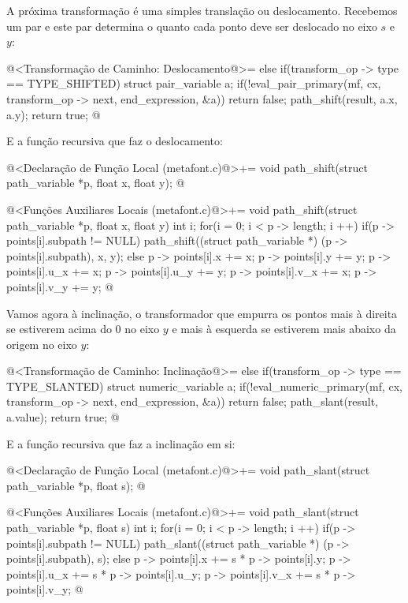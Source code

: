 {A próxima transformação é uma simples translação ou
deslocamento. Recebemos um par e este par determina o quanto cada
ponto deve ser deslocado no eixo $s$ e $y$:

\iniciocodigo
@<Transformação de Caminho: Deslocamento@>=
else if(transform_op -> type == TYPE_SHIFTED){
  struct pair_variable a;
  if(!eval_pair_primary(mf, cx, transform_op -> next, end_expression,
                          &a))
    return false;
  path_shift(result, a.x, a.y);  
  return true;
}
@
\fimcodigo

E a função recursiva que faz o deslocamento:

\iniciocodigo
@<Declaração de Função Local (metafont.c)@>+=
void path_shift(struct path_variable *p, float x, float y);
@
\fimcodigo

\iniciocodigo
@<Funções Auxiliares Locais (metafont.c)@>+=
void path_shift(struct path_variable *p, float x, float y){
  int i;
  for(i = 0; i < p -> length; i ++){
    if(p -> points[i].subpath != NULL)
      path_shift((struct path_variable *) (p -> points[i].subpath), x, y);
    else{
      p -> points[i].x += x;
      p -> points[i].y += y;
      p -> points[i].u_x += x;
      p -> points[i].u_y += y;
      p -> points[i].v_x += x;
      p -> points[i].v_y += y;
    }
  }
}
@
\fimcodigo

Vamos agora à inclinação, o transformador que empurra os pontos mais à
direita se estiverem acima do 0 no eixo $y$ e mais à esquerda se
estiverem mais abaixo da origem no eixo $y$:

\iniciocodigo
@<Transformação de Caminho: Inclinação@>=
else if(transform_op -> type == TYPE_SLANTED){
  struct numeric_variable a;
  if(!eval_numeric_primary(mf, cx, transform_op -> next, end_expression,
                          &a))
    return false;
  path_slant(result, a.value);  
  return true;
}
@
\fimcodigo

E a função recursiva que faz a inclinação em si:

\iniciocodigo
@<Declaração de Função Local (metafont.c)@>+=
void path_slant(struct path_variable *p, float s);
@
\fimcodigo

\iniciocodigo
@<Funções Auxiliares Locais (metafont.c)@>+=
void path_slant(struct path_variable *p, float s){
  int i;
  for(i = 0; i < p -> length; i ++){
    if(p -> points[i].subpath != NULL)
      path_slant((struct path_variable *) (p -> points[i].subpath), s);
    else{
      p -> points[i].x += s * p -> points[i].y;
      p -> points[i].u_x += s * p -> points[i].u_y;
      p -> points[i].v_x += s * p -> points[i].v_y;
    }
  }
}
@
\fimcodigo

}
